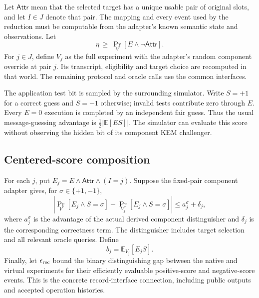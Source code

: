 \documentclass[pdflatex]{sn-jnl}
\theoremstyle{thmstyleone}
\theoremstyle{thmstylethree}
\theoremstyle{thmstyletwo}
\begin{document}
Let $\mathsf{Attr}$ mean that the selected target has a unique usable pair of
original slots, and let $I\in J$ denote that pair. The mapping and every event
used by the reduction must be computable from the adapter's known semantic
state and observations. Let
\[
 \eta\ \geq\ \Pr_V[E\wedge\neg\mathsf{Attr}].
\]
For $j\in J$, define $V_j$ as the full experiment with the adapter's random
component override at pair $j$. Its transcript, eligibility and target choice
are recomputed in that world. The remaining protocol and oracle calls use
the common interfaces.

The application test bit is sampled by the surrounding simulator. Write
$S=+1$ for a correct guess and $S=-1$ otherwise; invalid tests contribute zero
through $E$. Every $E=0$ execution is completed by an independent fair guess.
Thus the usual message-guessing advantage is
$\tfrac12|\mathbb E[E S]|$.
The simulator can evaluate this score without observing the hidden bit of its
component KEM challenger.

\subsection{Centered-score composition}

For each $j$, put $E_j=E\wedge\mathsf{Attr}\wedge(I=j)$.
Suppose the fixed-pair component adapter gives, for $\sigma\in\{+1,-1\}$,
\begin{equation}
\left|\Pr_V[E_j\wedge S=\sigma]
      -\Pr_{V_j}[E_j\wedge S=\sigma]\right|
 \leq a_j^\sigma+\delta_j,                         \label{eq:component-hop}
\end{equation}
where $a_j^\sigma$ is the advantage of the actual derived component
distinguisher and $\delta_j$ is the corresponding correctness term.
The distinguisher includes target selection and all relevant oracle queries.
Define
\[
 b_j=\mathbb E_{V_j}[E_jS].
\]
Finally, let $\epsilon_{\rm rec}$ bound the binary distinguishing gap between
the native and virtual experiments for their efficiently evaluable
positive-score and negative-score events. This is the concrete record-interface
connection, including public outputs and accepted operation histories.
\end{document}
